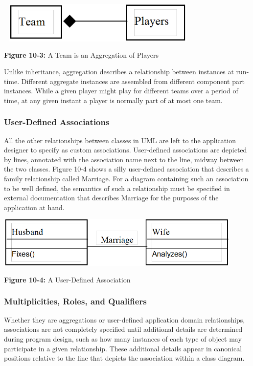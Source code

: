 \bigskip

\includegraphics[width=4.0in,height=0.8in]{ub-img/aggregat.png} 

{\sffamily\bfseries Figure 10-3:}
{\sffamily A Team is an Aggregation of Players}

\bigskip

Unlike inheritance, aggregation describes a relationship between
instances at run-time. Different aggregate instances are assembled from
different component part instances. While a given player might play for
different teams over a period of time, at any given instant a player is
normally part of at most one team.

\subsubsection{User-Defined Associations}
All the other relationships between classes in UML are left
to the application designer to specify as custom associations.
User-defined associations are depicted by lines, annotated with the
association name next to the line, midway between the two classes.
Figure 10-4 shows a silly user-defined association that describes a
family relationship called Marriage. For a diagram containing such an
association to be well defined, the semantics of such a relationship
must be specified in external documentation that describes Marriage for
the purposes of the application at hand.

\bigskip

\includegraphics[width=4.8in,height=1.0in]{ub-img/marriage.png} 

{\sffamily\bfseries Figure 10-4:}
{\sffamily A User-Defined Association}

\bigskip

\subsubsection{Multiplicities, Roles, and Qualifiers}
Whether they are aggregations or user-defined application domain
relationships, associations are not completely specified until
additional details are determined during program design, such as how
many instances of each type of object may participate in a given
relationship. These additional details appear in canonical positions
relative to the line that depicts the association within a class
diagram.

